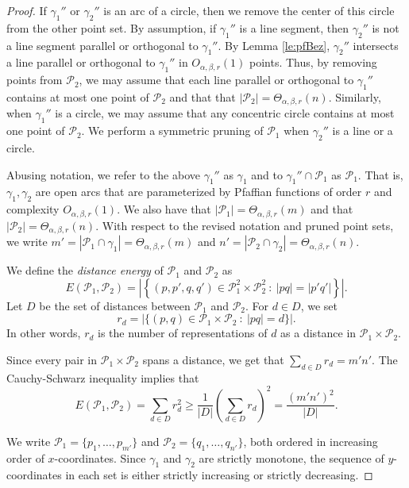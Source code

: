 \documentclass[11pt]{article}
\theoremstyle{definition}
\newcommand{\parag}[1]{\vspace{2mm}
\noindent{\bf #1} }
\newcommand{\pts}{\mathcal{P}}
\begin{document}
\begin{proof}
If $\gamma_1''$ or $\gamma_2''$ is an arc of a  circle, then we remove the center of this circle from the other point set.
By assumption, if $\gamma_1''$ is a line segment, then $\gamma_2''$ is not a line segment parallel or orthogonal to $\gamma_1''$.
By Lemma \ref{le:pfBez}, $\gamma_2''$ intersects a line parallel or orthogonal to $\gamma_1''$ in $O_{\alpha,\beta,r}(1)$ points. 
Thus, by removing points from $\pts_2$, we may assume that each line parallel or orthogonal to $\gamma_1''$ contains at most one point of $\pts_2$ and that that $|\pts_2|=\Theta_{\alpha,\beta,r}(n)$.
Similarly, when $\gamma_1''$ is a circle, we may assume that any concentric circle contains at most one point of $\pts_2$. 
We perform a symmetric pruning of $\pts_1$ when $\gamma_2''$ is a line or a circle.

Abusing notation, we refer to the above $\gamma_1''$ as $\gamma_1$ and to $\gamma_1'' \cap \pts_1$ as $\pts_1$.
That is, $\gamma_1,\gamma_2$ are open arcs that are parameterized by Pfaffian functions of order $r$ and complexity $O_{\alpha,\beta,r}(1)$.
We also have that $|\pts_1|=\Theta_{\alpha,\beta,r}(m)$ and that $|\pts_2|=\Theta_{\alpha,\beta,r}(n)$.
With respect to the revised notation and pruned point sets, we write $m'=|\pts_1\cap \gamma_1|=\Theta_{\alpha,\beta,r}(m)$ and $n'=|\pts_2\cap \gamma_2|=\Theta_{\alpha,\beta,r}(n)$.

\parag{Distance energy and proximity.} 
We define the \emph{distance energy} of $\pts_1$ and $\pts_2$ as 
\[ E(\pts_1,\pts_2) = \left|\left\{(p,p',q,q')\in \pts_1^2\times \pts_2^2\ :\ |pq|=|p'q'| \right\}\right|.\]
Let $D$ be the set of distances between $\pts_1$ and $\pts_2$.
For $d\in D$, we set 
%
\[ r_d = \left|\{(p,q)\in \pts_1\times \pts_2\ :\ |pq| = d\}\right|. \] 
%
In other words, $r_d$ is the number of representations of $d$ as a distance in $\pts_1\times\pts_2$. 

Since every pair in $\pts_1\times\pts_2$ spans a distance, we get that $\sum_{d\in D} r_d = m'n'$.
The Cauchy-Schwarz inequality implies that
%
\begin{equation} \label{eq:EnergyLower} E(\pts_1,\pts_2) = \sum_{d\in D} r_d^2
  \geq \frac{1}{|D|} \left( \sum_{d\in D} r_d   \right)^2 = \frac{(m'n')^2}{|D|}. 
\end{equation}

We write $\pts_1 = \{p_1,\ldots,p_{m'}\}$ and $\pts_2 = \{q_1,\ldots,q_{n'}\}$, both ordered in increasing order of $x$-coordinates.
Since $\gamma_1$ and $\gamma_2$ are strictly monotone, the sequence of $y$-coordinates in each set is either strictly increasing or strictly decreasing.


\end{proof}
\end{document}
